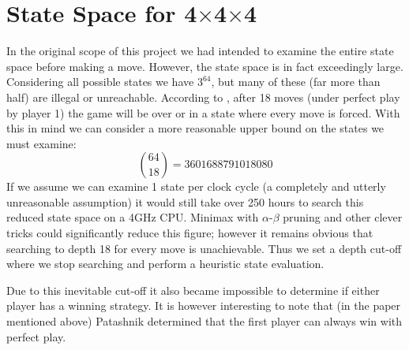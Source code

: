 \documentclass[10pt,twocolumn]{article}
\begin{document}
\section{State Space for 4$\times$4$\times$4}
In the original scope of this project we had intended to examine the entire state space
before making a move. However, the state space is in fact exceedingly large. Considering all
possible states we have $3^{64}$, but many of these (far more than half) are illegal or unreachable.
According to \cite{Patashnik1980}, after 18 moves (under perfect play by player 1)
the game will be over or in a state where every move is forced. With this in mind we can 
consider a more reasonable upper bound on the states we must examine:
{\small \[\binom{64}{18} = 3601688791018080\]}
If we assume we can examine 1 state per clock cycle (a completely and utterly unreasonable assumption) it would
still take over 250 hours to search this reduced state space on a 4GHz CPU. Minimax with $\alpha$-$\beta$ pruning
and other clever tricks could significantly reduce this figure; however it remains obvious that
searching to depth 18 for every move is unachievable. Thus we set a depth cut-off where we stop
searching and perform a heuristic state evaluation.

Due to this inevitable cut-off it also became impossible to determine if either
player has a winning strategy. It is however interesting to note that (in the paper
mentioned above) Patashnik determined that the first player can always win with perfect play. 
\end{document}
